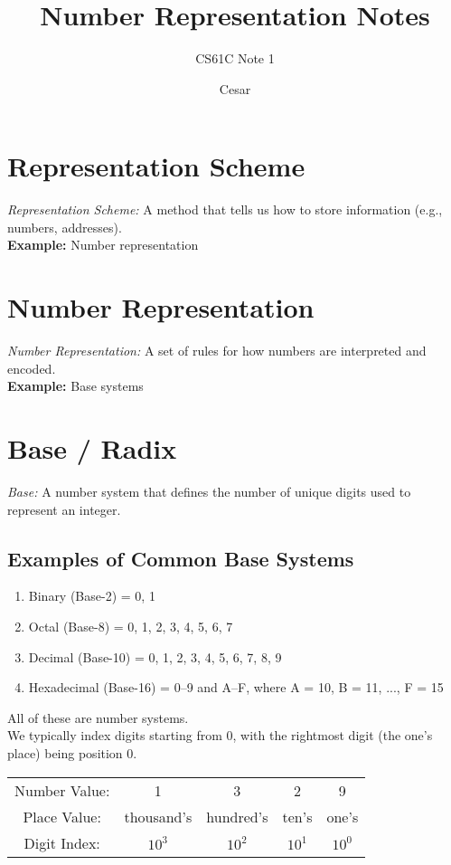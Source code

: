\documentclass{article}
\title{Number Representation Notes}
\author{CS61C Note 1}
\date{Cesar}
\begin{document}
\maketitle

\section{Representation Scheme}
\textit{Representation Scheme:} A method that tells us how to store information (e.g., numbers, addresses). \\

\noindent \textbf{Example:} Number representation

\section{Number Representation}
\textit{Number Representation:} A set of rules for how numbers are interpreted and encoded. \\

\noindent \textbf{Example:} Base systems

\section{Base / Radix}
\textit{Base:} A number system that defines the number of unique digits used to represent an integer. \\

\subsection*{Examples of Common Base Systems}
\begin{enumerate}
  \item Binary (Base-2) = 0, 1
  \item Octal (Base-8) = 0, 1, 2, 3, 4, 5, 6, 7
  \item Decimal (Base-10) = 0, 1, 2, 3, 4, 5, 6, 7, 8, 9
  \item Hexadecimal (Base-16) = 0--9 and A--F, where A = 10, B = 11, ..., F = 15
\end{enumerate}

\noindent All of these are number systems. \\

\noindent We typically index digits starting from 0, with the rightmost digit (the one's place) being position 0.

\begin{center}
\begin{tabular}{c c c c c}
Number Value: & 1 & 3 & 2 & 9 \\
Place Value:  & thousand's & hundred's & ten's & one's \\
Digit Index:  & $10^3$ & $10^2$ & $10^1$ & $10^0$ \\
\end{tabular}
\end{center}
\end{document}
